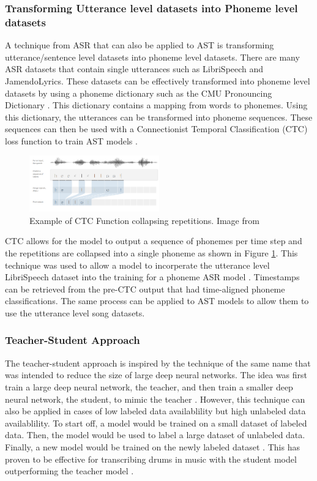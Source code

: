 \documentclass[letterpaper, 12pt]{article}
\begin{document}
\begin{multicols*}{2}
\subsubsection{Transforming Utterance level datasets into Phoneme level datasets} \label{sec:utteranceToPhoneme}
A technique from ASR that can also be applied to AST is transforming utterance/sentence
level datasets into phoneme level datasets. There are many ASR datasets that contain single utterances
such as LibriSpeech and JamendoLyrics. These datasets can be effectively
transformed into phoneme level datasets by using a phoneme dictionary such as the CMU Pronouncing
Dictionary \citep{CMUDict}. This dictionary contains a mapping from words to phonemes. Using this
dictionary, the utterances can be transformed into phoneme sequences. These sequences can then be
used with a Connectionist Temporal Classification (CTC) loss function to train AST models \citep{CTC}.
\begin{figure}
    \centering
    \includegraphics[width=0.5\textwidth]{assets/CTC.png}
    \caption{Example of CTC Function collapsing repetitions. Image from \citep{CTC}}
    \label{fig:CTC}
\end{figure}
CTC allows for the model to output a sequence of phonemes per time step and the
repetitions are collapsed into a single phoneme as shown in Figure \ref{fig:CTC}.
This technique was used to allow a model to incorperate the utterance level LibriSpeech
dataset into the training for a phoneme ASR model \citep{wav2vec}. Timestamps can be
retrieved from the pre-CTC output that had time-aligned phoneme classifications.
The same process can be applied to AST models to allow them to use the utterance level song datasets.

\subsubsection{Teacher-Student Approach} \label{sec:TeacherStudent}
The teacher-student approach is inspired by the technique of the same name that was intended
to reduce the size of large deep neural networks. The idea was first train a large deep neural
network, the teacher, and then train a smaller deep neural network, the student, to mimic the
teacher \citep{TeacherStudent}. However, this technique can also be applied in cases of low labeled
data availablility but high unlabeled data availablility. To start off, a model would be
trained on a small dataset of labeled data. Then, the model would be used to label a large dataset
of unlabeled data. Finally, a new model would be trained on the newly labeled dataset
\citep{DALI}. This has proven to be effective for transcribing drums in music with the student
model outperforming the teacher model \citep{DrumsStudentTeacher}.


\end{multicols*}
\end{document}
